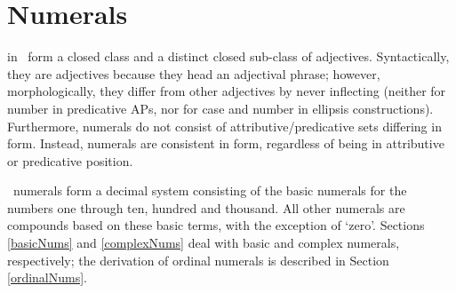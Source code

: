 \section{Numerals}\label{numerals}
in \PS\ form a closed class and a distinct closed sub-class of adjectives. Syntactically, they are adjectives because they head an adjectival phrase; however, morphologically, they differ from other adjectives by never inflecting (neither for number in predicative APs, nor for case and number in ellipsis constructions). 
Furthermore, numerals do not consist of attributive/predicative sets differing in form. %
Instead, numerals are consistent in form, regardless of being in attributive or predicative position. %

\PS\ numerals form a decimal system consisting of the basic numerals for the numbers one through ten, hundred and thousand. All other numerals are compounds based on these basic terms, with the exception of  ‘zero’. Sections \ref{basicNums} and \ref{complexNums} deal with basic and complex numerals, respectively; the derivation of ordinal numerals is described in Section \ref{ordinalNums}. %

